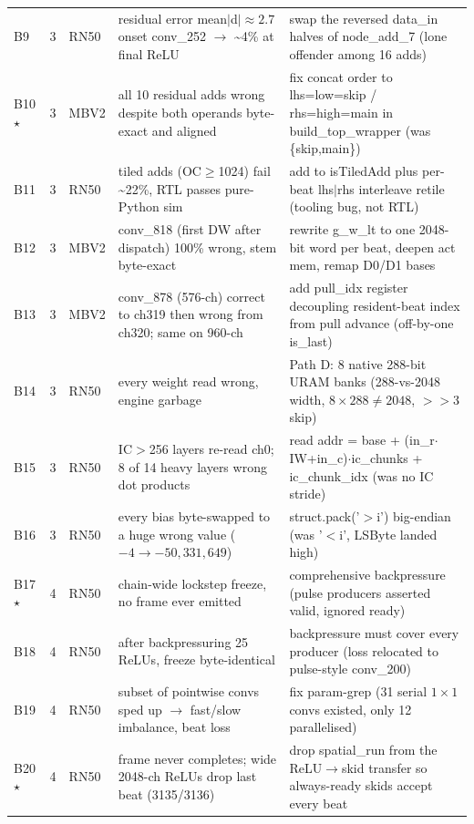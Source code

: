 \begin{footnotesize}
\begin{longtable}{@{}l l l p{} p{}@{}}
B9 & 3 & RN50 & residual error mean$|$d$|\approx2.7$ onset conv\_252 $\rightarrow$ \textasciitilde{}4\% at final ReLU & swap the reversed data\_in halves of node\_add\_7 (lone offender among 16 adds) \\
B10 $\star$ & 3 & MBV2 & all 10 residual adds wrong despite both operands byte-exact and aligned & fix concat order to lhs=low=skip / rhs=high=main in build\_top\_wrapper (was \{skip,main\}) \\
B11 & 3 & RN50 & tiled adds (OC$\geq$1024) fail \textasciitilde{}22\%, RTL passes pure-Python sim & add to isTiledAdd plus per-beat lhs$|$rhs interleave retile (tooling bug, not RTL) \\
B12 & 3 & MBV2 & conv\_818 (first DW after dispatch) 100\% wrong, stem byte-exact & rewrite g\_w\_lt to one 2048-bit word per beat, deepen act mem, remap D0/D1 bases \\
B13 & 3 & MBV2 & conv\_878 (576-ch) correct to ch319 then wrong from ch320; same on 960-ch & add pull\_idx register decoupling resident-beat index from pull advance (off-by-one is\_last) \\
B14 & 3 & RN50 & every weight read wrong, engine garbage & Path D: 8 native 288-bit URAM banks (288-vs-2048 width, $8\times288\neq2048$, $>>$3 skip) \\
B15 & 3 & RN50 & IC$>$256 layers re-read ch0; 8 of 14 heavy layers wrong dot products & read addr = base + (in\_r$\cdot$IW+in\_c)$\cdot$ic\_chunks + ic\_chunk\_idx (was no IC stride) \\
B16 & 3 & RN50 & every bias byte-swapped to a huge wrong value ($-4 \rightarrow -50{,}331{,}649$) & struct.pack('$>$i') big-endian (was '$<$i', LSByte landed high) \\
B17 $\star$ & 4 & RN50 & chain-wide lockstep freeze, no frame ever emitted & comprehensive backpressure (pulse producers asserted valid, ignored ready) \\
B18 & 4 & RN50 & after backpressuring 25 ReLUs, freeze byte-identical & backpressure must cover every producer (loss relocated to pulse-style conv\_200) \\
B19 & 4 & RN50 & subset of pointwise convs sped up $\rightarrow$ fast/slow imbalance, beat loss & fix param-grep (31 serial $1\times1$ convs existed, only 12 parallelised) \\
B20 $\star$ & 4 & RN50 & frame never completes; wide 2048-ch ReLUs drop last beat (3135/3136) & drop spatial\_run from the ReLU$\rightarrow$skid transfer so always-ready skids accept every beat \\

\end{longtable}
\end{footnotesize}
